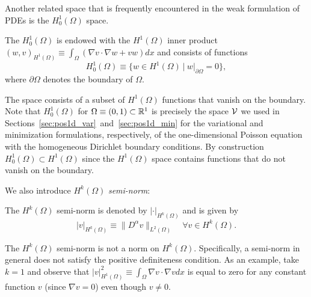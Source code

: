 Another related space that is frequently encountered in the weak formulation of PDEs is the $H^1_0(\Omega)$ space.
\begin{definition} The $H^1_0(\Omega)$ is endowed with the $H^1(\Omega)$ inner product $(w,v)_{H^1(\Omega)} \equiv \int_\Omega (\nabla v \cdot \nabla w + v w) dx$ and consists of functions
\begin{equation*}
  H^1_0(\Omega) \equiv \{ w \in H^1(\Omega) \ | \ w|_{\partial \Omega} = 0 \},
\end{equation*}
where $\partial \Omega$ denotes the boundary of $\Omega$.
\end{definition}
The space consists of a subset of $H^1(\Omega)$ functions that vanish on the boundary.  Note that $H^1_0(\Omega)$ for $\Omega \equiv (0,1) \subset \mathbb{R}^1$ is precisely the space $\mathcal{V}$ we used in Sections~\eqref{sec:pos1d_var}~and~\eqref{sec:pos1d_min} for the variational and minimization formulations, respectively, of the one-dimensional Poisson equation with the homogeneous Dirichlet boundary conditions.  By construction $H^1_0(\Omega) \subset H^1(\Omega)$ since the $H^1(\Omega)$ space contains functions that do not vanish on the boundary.

We also introduce $H^k(\Omega)$ \emph{semi-norm}:
\begin{definition}
  The $H^k(\Omega)$ semi-norm is denoted by $| \cdot |_{H^k(\Omega)}$ and is given by
  \begin{equation*}
    | v |_{H^k(\Omega)} \equiv \| D^\alpha v \|_{L^2(\Omega)} \quad \forall v \in H^k(\Omega).
  \end{equation*}  
\end{definition}
\begin{remark}
  The $H^k(\Omega)$ semi-norm is not a norm on $H^k(\Omega)$.  Specifically, a semi-norm in general does not satisfy the positive definiteness condition.  As an example, take $k = 1$ and observe that $| v |^2_{H^1(\Omega)} \equiv \int_{\Omega} \nabla v \cdot \nabla v dx$ is equal to zero for any constant function $v$ (since $\nabla v = 0$) even though $v \neq 0$.
\end{remark}

